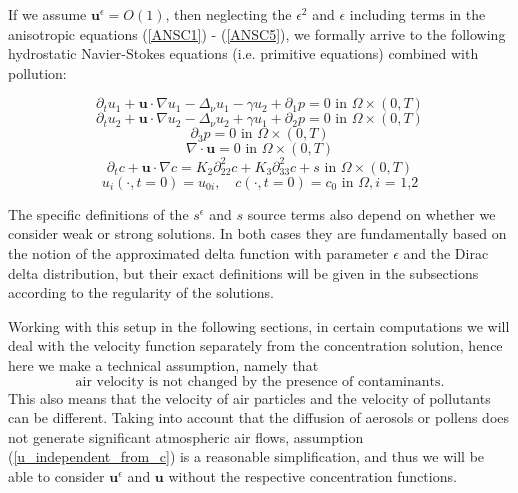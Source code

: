 \documentclass[11pt]{article}
\begin{document}
If we assume $\mathbf{u}^\epsilon = O(1)$, then neglecting the $\epsilon^2$ and $\epsilon$ including terms in the anisotropic equations (\ref{ANSC1}) - (\ref{ANSC5}), we formally arrive to the following hydrostatic Navier-Stokes equations (i.e. primitive equations) combined with pollution:

\begin{equation} \label{HNSC1}
\partial_t u_1 + \mathbf{u} \cdot \nabla u_1 - \Delta_\nu u_1 -\gamma u_2 + \partial_1 p = 0 \text{ in } \Omega \times (0,T)
\end{equation}
%
\begin{equation} \label{HNSC2}
\partial_t u_2 + \mathbf{u} \cdot \nabla u_2 - \Delta_\nu u_2 + \gamma u_1 + \partial_2 p = 0 \text{ in } \Omega \times (0,T)
\end{equation}
%
\begin{equation} \label{HNSC3}
\partial_3 p = 0 \text{ in } \Omega \times (0,T)
\end{equation}
%
\begin{equation} \label{HNSC4}
\nabla \cdot \mathbf{u} = 0 \text{ in } \Omega \times (0,T)
\end{equation}
%
\begin{equation} \label{HNSC5}
\partial_t c + \mathbf{u} \cdot \nabla c = K_2 \partial_{22} ^ 2 c + K_3 \partial_{33} ^2 c + s \text{ in } \Omega \times (0,T)
\end{equation}
%
\begin{equation} \label{HNSC_init}
u_i (\cdot, t=0) = u_{0 i}, \quad c (\cdot, t=0) = c_0 \text{ in } \Omega, \text{$i$ = 1,2}
\end{equation}

The specific definitions of the $s^\epsilon$ and $s$ source terms also depend on whether we consider weak or strong solutions. In both cases they are fundamentally based on the notion of the approximated delta function with parameter $\epsilon$ and the Dirac delta distribution, but their exact definitions will be given in the subsections according to the regularity of the solutions.

Working with this setup in the following sections, in certain computations we will deal with the velocity function separately from the concentration solution, hence here we make a technical assumption, namely that
\begin{equation}\label{u_independent_from_c}\text{air velocity is not changed by the presence of contaminants.}\end{equation}
This also means that the velocity of air particles and the velocity of pollutants can be different. Taking into account that the diffusion of aerosols or pollens does not generate significant atmospheric air flows, assumption (\ref{u_independent_from_c}) is a reasonable simplification, and thus we will be able to consider $\mathbf{u}^\epsilon$ and $\mathbf{u}$ without the respective concentration functions.
\end{document}
